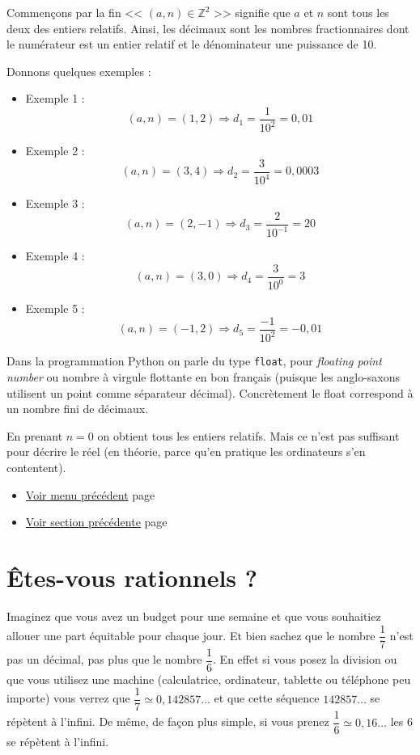 \documentclass[a4paper,11pt]{book}
\begin{document}
Commençons par la fin <<  \((a, n)\in\mathbb{Z}^2\)  >> signifie que \(a\) et
\(n\) sont tous les deux des entiers relatifs. Ainsi, les décimaux sont les nombres
fractionnaires dont le numérateur est un entier relatif et le
dénominateur une puissance de 10.

Donnons quelques exemples :
\begin{itemize}
\item Exemple 1 : \[(a, n) = (1, 2)\Rightarrow d_1 = \dfrac{1}{10^2} = 0,01\]
\item Exemple 2 : \[(a, n) = (3, 4)\Rightarrow d_2 = \dfrac{3}{10^4} = 0,0003\]
\item Exemple 3 : \[(a, n) = (2, -1)\Rightarrow d_3 = \dfrac{2}{10^{-1}} = 20\]
\item Exemple 4 : \[(a, n) = (3, 0)\Rightarrow d_4 = \dfrac{3}{10^0} = 3\]
\item Exemple 5 : \[(a, n) = (-1, 2)\Rightarrow d_5 = \dfrac{-1}{10^2} = -0,01\]
\end{itemize}

Dans la programmation Python on parle du type \texttt{float}, pour
\emph{floating point number} ou nombre à virgule flottante en bon
français (puisque les anglo-saxons utilisent un point comme
séparateur décimal). Concrètement le 
\gls{float} correspond à un nombre fini de décimaux.


En prenant \(n = 0\) on obtient tous les entiers
relatifs. Mais ce n'est pas suffisant pour
décrire le réel (en théorie, parce qu'en pratique les ordinateurs s'en
contentent).



\begin{itemize}
\item \hyperref[orga5086f2]{Voir menu précédent} page \pageref{page:content1-menu}
\item \hyperref[orgdf90d81]{Voir section précédente} page \pageref{page:sec2.1.2int}
\end{itemize}

\clearpage

\section{Êtes-vous rationnels ?}
\label{sec:org5825362}
\label{orgeac9191}
\label{page:sec2.1.4rational}

Imaginez que vous avez un budget pour une semaine et que vous
souhaitiez allouer une part équitable pour chaque jour. Et bien
sachez que le nombre \(\dfrac{1}{7}\) n'est pas un
décimal, pas plus que le nombre \(\dfrac{1}{6}\). En
effet si vous posez la division ou que vous utilisez une machine
(calculatrice, ordinateur, tablette ou téléphone peu importe) vous
verrez que \(\dfrac{1}{7} \simeq 0,142857\dots\) et que cette séquence
\(142857\dots\) se répètent à l'infini. De même, de façon plus simple,
si vous prenez \(\dfrac{1}{6} \simeq 0,16\dots\) les 6 se répètent à
l'infini.
\end{document}
